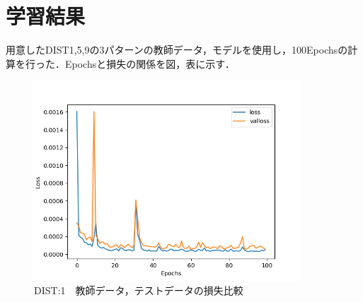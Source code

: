 \documentclass{jreport}		%
\begin{document}
\section{学習結果}
用意したDIST1,5,9の3パターンの教師データ，モデルを使用し，100Epochsの計算を行った．Epochsと損失の関係を図，表に示す．
\begin{figure}[htbp]
 \begin{center}
  \includegraphics[width=100mm]{gain1_loss_hikaku.png}
 \end{center}
 \caption{DIST:1　教師データ，テストデータの損失比較}
 \label{fig:one}
\end{figure}
\end{document}
